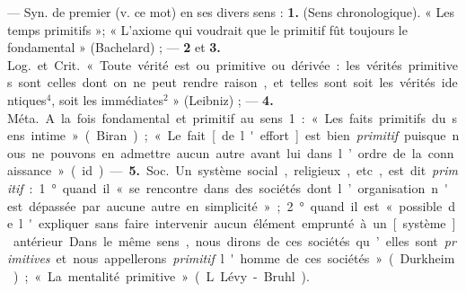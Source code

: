 \begin{itemize}[leftmargin=1cm, label=, itemsep=1pt]
 — Syn. de premier (v. ce mot) en ses divers sens : {\bf 1.}
(Sens chronologique). « Les temps primitifs »; « L’axiome qui voudrait que
le primitif fût toujours le fondamental » (Bachelard) ; — {\bf 2} et
{\bf 3.} \si{Log.} et \si{Crit.} « Toute vérité est ou primitive ou
dérivée : les vérités primitives sont celles dont on ne peut rendre raison,
et telles sont soit les vérités identiques$^4$, soit les immédiates$^2$
» (Leibniz) ; — {\bf 4.} \si{Méta.} A la fois fondamental et primitif au
sens 1 : « Les faits primitifs du sens intime » (Biran) ; « Le fait [de
l'effort] est bien {\it primitif} puisque nous ne pouvons en admettre aucun
autre avant lui dans l’ordre de la connaissance » (id.).

— {\bf 5.} \si{Soc.} Un système social, religieux, etc, est dit
{\it primitif} : 1° quand il « se rencontre dans des sociétés dont
l’organisation n'est dépassée par aucune autre en simplicité » ; 2° quand il
est « possible de l'expliquer sans faire intervenir aucun élément emprunté à
un [système] antérieur. Dans le même sens, nous dirons de ces sociétés
qu’elles sont {\it primitives} et nous appellerons {\it primitif} l'homme de
ces sociétés » (Durkheim) ; « La mentalité primitive » (L. Lévy-Bruhl).


\end{itemize}
